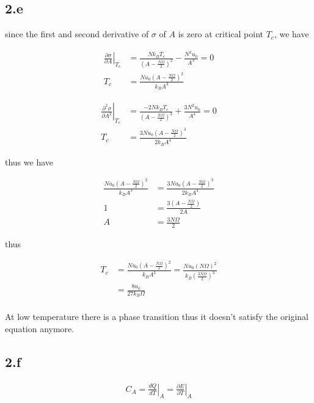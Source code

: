 \documentclass{article}
\begin{document}
\subsection*{2.e}
since the first and second derivative of $\sigma$ of $A$ is zero at critical point $T_c$, we have

$$
\begin{aligned}
    \left.\frac{\partial \sigma}{\partial A}\right|_{T_c} &= \frac{N k_B T_c}{(A - \frac{N\Omega}{2})^2} - \frac{N^2 u_0}{A^3} = 0\\
    T_c &= \frac{N u_0 (A - \frac{N\Omega}{2})^2}{k_B A^3}
\end{aligned}
$$

$$
\begin{aligned}
    \left.\frac{\partial^2 \sigma}{\partial A^2}\right|_{T_c} &= \frac{-2N k_B T_c}{(A - \frac{N\Omega}{2})^3} + \frac{3N^2 u_0}{A^4} = 0\\
    T_c &= \frac{3N u_0 (A - \frac{N\Omega}{2})^3}{2 k_B A^4}
\end{aligned}
$$

thus we have

$$
\begin{aligned}
    \frac{N u_0 (A - \frac{N\Omega}{2})^2}{k_B A^3} &= \frac{3N u_0 (A - \frac{N\Omega}{2})^3}{2 k_B A^4}\\
     1 &= \frac{3 (A - \frac{N\Omega}{2})}{2 A}\\
     A &= \frac{3N\Omega}{2}
\end{aligned}
$$

thus

$$
\begin{aligned}
    T_c &= \frac{N u_0 (A - \frac{N\Omega}{2})^2}{k_B A^3} = \frac{N u_0 (N\Omega)^2}{k_B (\frac{3N\Omega}{2})^3}\\
    &=\frac{8 u_0 }{27 k_B \Omega}\\
\end{aligned}
$$

At low temperature there is a phase transition thus it doesn't satisfy the original equation anymore.

\subsection*{2.f}

$$
\begin{aligned}
    C_A = \left.\frac{dQ}{dT}\right|_A = \left.\frac{\partial E}{\partial T}\right|_A
\end{aligned}
$$
\end{document}
